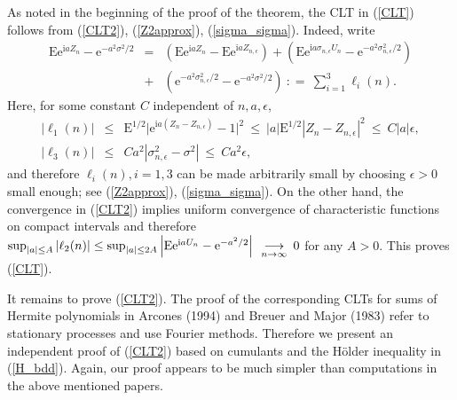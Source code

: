 \documentclass[10pt]{article}
\def\i{\mathrm i}
\def\e{\mathrm e}
\def\E{\mathrm E}
\def\limiten{\renewcommand{\arraystretch}{0.5}
\begin{array}[t]{c}
\stackrel{}{\longrightarrow} \\
{\scriptstyle n\rightarrow\infty}
\end{array}\renewcommand{\arraystretch}{1}}
\begin{document}
As noted in the beginning of the proof of the theorem, the CLT in
(\ref{CLT}) follows from (\ref{CLT2}), (\ref{Z2approx}),
(\ref{sigma_sigma}). Indeed, write
\begin{eqnarray*}
\E \e^{\i a Z_n} - \e^{-a^2 \sigma^2/2} &=&\left(\E \e^{\i a Z_n}-
\E \e^{\i a Z_{n,\epsilon}}\right) +
\left(\E \e^{\i a \sigma_{n,\epsilon} U_{n}} - \e^{-a^2\sigma^2_{n,\epsilon}/2}\right) \\
&+&\left( \e^{-a^2\sigma^2_{n,\epsilon}/2} -
\e^{-a^2\sigma^2/2}\right) \ : = \ \sum_{i=1}^3 \ell_i(n).
\end{eqnarray*}
Here, for some constant $C$ independent of $n, a, \epsilon $,
\begin{eqnarray*}
|\ell_1(n)|&\le&\E^{1/2}\big|{\e}^{\i a(Z_n-Z_{n,\epsilon})}
-1\big |^2 \
\le \ |a|\E^{1/2} |Z_n -Z_{n,\epsilon}|^2 \ \le\  C|a| \epsilon, \\
|\ell_3(n)|&\le&Ca^2 \left|\sigma^2_{n,\epsilon} - \sigma^2\right|
\ \le \  Ca^2 \epsilon,
\end{eqnarray*}
and therefore $\ell_i(n), i =1, 3 $ can be made arbitrarily small by
choosing $\epsilon >0$ small enough; see (\ref{Z2approx}),
(\ref{sigma_sigma}).  On the other hand, the convergence in
(\ref{CLT2}) implies  uniform convergence of characteristic
functions on compact intervals and therefore $\sup_{|a| \le A}
|\ell_2(n)| \le \sup_{|a|\le 2A}  \left|\E \e^{\i a U_{n}} -
\e^{-a^2/2}\right| \limiten 0$ for any $A>0$.  This proves
(\ref{CLT}).


\smallskip

 It remains to prove (\ref{CLT2}). The proof of the
corresponding CLTs for sums of Hermite polynomials in Arcones (1994)
and Breuer and Major (1983) refer to stationary processes and use
Fourier methods. Therefore we present an independent proof of
(\ref{CLT2}) based on cumulants and the H\"older inequality in
(\ref{H_bdd}). Again, our proof appears to be much simpler than
computations in the above mentioned papers.
\end{document}
